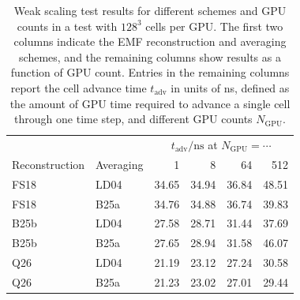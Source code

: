 \begin{table}
\centering
\caption{Weak scaling test results for different schemes and GPU counts in a test with $128^3$ cells per GPU. The first two columns indicate the EMF reconstruction and averaging schemes, and the remaining columns show results as a function of GPU count. Entries in the remaining columns report the cell advance time $t_\mathrm{adv}$ in units of ns, defined as the amount of GPU time required to advance a single cell through one time step, and different GPU counts $N_\mathrm{GPU}$.}
\label{tab:weak_scaling_zone_update_times_ngpu}
\begin{tabular}{llrrrr}
\hline\hline
& & \multicolumn{4}{c}{$t_\mathrm{adv}/\mathrm{ns}$ at $N_\mathrm{GPU}=\cdots$} \\
Reconstruction & Averaging & 1 & 8 & 64 & 512 \\
\hline
FS18 & LD04  & 34.65 & 34.94 & 36.84 & 48.51 \\
FS18 & B25a  & 34.76 & 34.88 & 36.74 & 39.83 \\
B25b & LD04  & 27.58 & 28.71 & 31.44 & 37.69 \\
B25b & B25a  & 27.65 & 28.94 & 31.58 & 46.07 \\
Q26  & LD04  & 21.19 & 23.12 & 27.24 & 30.58 \\
Q26  & B25a  & 21.23 & 23.02 & 27.01 & 29.44 \\
\hline\hline
\end{tabular}
\end{table}